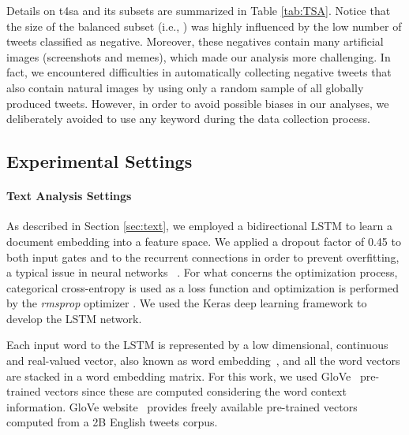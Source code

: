 Details on \gls{t4sa} and its subsets are summarized in Table \ref{tab:TSA}.
Notice that the size of the balanced subset (i.e., {\BTSA}) was highly influenced by the low number of tweets classified as negative. Moreover, these negatives contain many artificial images (\eg screenshots and memes), which made our analysis more challenging.   %
In fact, we encountered difficulties in automatically collecting negative tweets that also contain natural images by using only a random sample of all globally produced tweets. However, in order to avoid possible biases in our analyses, we deliberately avoided to use any keyword during the data collection process.


%


\subsection{Experimental Settings}
\label{exp:visual} %
\paragraph{Text Analysis Settings}
As described in Section \ref{sec:text}, we employed a bidirectional LSTM to learn a document embedding into a feature space.  We  applied  a  dropout  factor of 0.45 to both input  gates and to the recurrent connections in order to prevent  overfitting,  a  typical  issue  in  neural networks ~\cite{gal2016theoretically}. For  what  concerns  the  optimization process, categorical cross-entropy is used as a loss function and optimization is performed by the \emph{rmsprop} optimizer \cite{tieleman2012lecture}. We used the Keras \cite{libkeras} deep learning framework to develop the LSTM network.

Each input word to the LSTM is represented by a low dimensional, continuous and real-valued vector, also known as word embedding~\cite{MikolovSCCD13}, and all the word vectors are stacked in a word embedding matrix. For this work, we used GloVe~\cite{pennington2014glove} pre-trained vectors since these are computed considering the word context information. GloVe website~ provides freely available pre-trained vectors computed from a 2B English tweets corpus.

